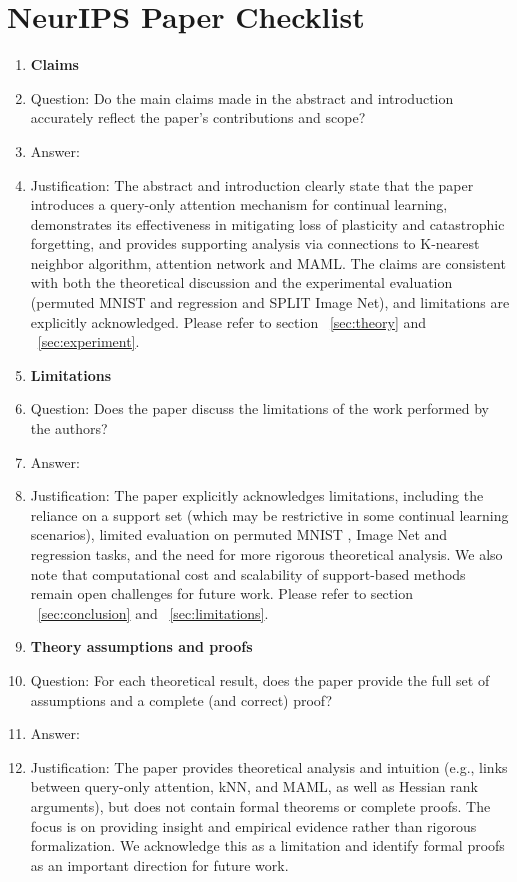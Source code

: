 \documentclass{article}
\begin{document}

\newpage
\section*{NeurIPS Paper Checklist}

\begin{enumerate}

\item {\bf Claims}
    \item[] Question: Do the main claims made in the abstract and introduction accurately reflect the paper's contributions and scope?
    \item[] Answer: \answerYes{} %
    \item[] Justification: The abstract and introduction clearly state that the paper introduces a query-only attention mechanism for continual learning, demonstrates its effectiveness in mitigating loss of plasticity and catastrophic forgetting, and provides supporting analysis via connections to K-nearest neighbor algorithm, attention network and MAML. The claims are consistent with both the theoretical discussion and the experimental evaluation (permuted MNIST and regression and SPLIT Image Net), and limitations are explicitly acknowledged. Please refer to section ~\ref{sec:theory} and ~\ref{sec:experiment}.

\item {\bf Limitations}
    \item[] Question: Does the paper discuss the limitations of the work performed by the authors?
    \item[] Answer:  \answerYes{} %
    \item[] Justification: The paper explicitly acknowledges limitations, including the reliance on a support set (which may be restrictive in some continual learning scenarios), limited evaluation on permuted MNIST , Image Net and regression tasks, and the need for more rigorous theoretical analysis. We also note that computational cost and scalability of support-based methods remain open challenges for future work. Please refer to section ~\ref{sec:conclusion} and ~\ref{sec:limitations}.
 

\item {\bf Theory assumptions and proofs}
    \item[] Question: For each theoretical result, does the paper provide the full set of assumptions and a complete (and correct) proof?
    \item[] Answer: \answerNo{} %
    \item[] Justification: The paper provides theoretical analysis and intuition (e.g., links between query-only attention, kNN, and MAML, as well as Hessian rank arguments), but does not contain formal theorems or complete proofs. The focus is on providing insight and empirical evidence rather than rigorous formalization. We acknowledge this as a limitation and identify formal proofs as an important direction for future work.



\end{enumerate}
\end{document}
